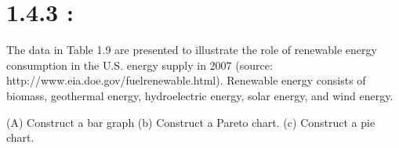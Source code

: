 \documentclass{article}
\begin{document}
\newpage
\section{{\huge 1.4.3 :}}


\begingroup
 
The data in Table 1.9 are presented to illustrate the role of renewable energy consumption in the U.S. energy supply
in 2007 (source: http://www.eia.doe.gov/fuelrenewable.html). Renewable energy consists of biomass, geothermal
energy, hydroelectric energy, solar energy, and wind energy.

\smallskip
\smallskip 
	\textsc{(A)} Construct a bar graph 
	 \textsc (b) Construct a Pareto chart.
\textsc (c) Construct a pie chart.
	
\endgroup
\end{document}
